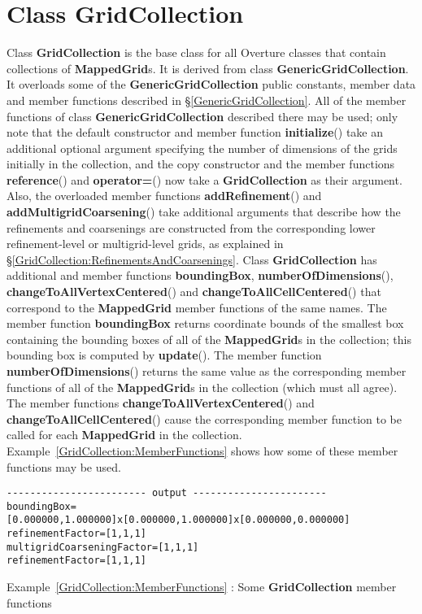 \documentclass{article}
\newcommand{\Index}[1]{#1\index{#1}}
\begin{document}
\section{Class \textbf{\Index{GridCollection}}}
\label{GridCollection}

Class \textbf{GridCollection} is the base class for all Overture classes that contain collections of \textbf{MappedGrid}s.
It is derived from class \textbf{GenericGridCollection}.  It overloads some of the \textbf{GenericGridCollection} public
constants, member data and member functions described in \S\ref{GenericGridCollection}.  All of the member functions of class
\textbf{GenericGridCollection} described there may be used; only note that the default constructor and member function
\textbf{initialize}() take an additional optional argument specifying the number of dimensions of the grids initially in the
collection, and the copy constructor and the member functions \textbf{reference}() and \textbf{operator=}() now take a
\textbf{GridCollection} as their argument. Also, the overloaded member functions \textbf{addRefinement}() and
\textbf{addMultigridCoarsening}() take additional arguments that describe how the refinements and coarsenings are constructed from
the corresponding lower refinement-level or multigrid-level grids, as explained in \S\ref{GridCollection:RefinementsAndCoarsenings}.  Class
\textbf{GridCollection} has additional and member functions \textbf{boundingBox}, \textbf{numberOfDimensions}(),
\textbf{changeToAllVertexCentered}() and \textbf{changeToAllCellCentered}() that correspond to the
\textbf{MappedGrid} member functions of the same names. The member function \textbf{boundingBox} returns coordinate bounds
of the smallest box containing the bounding boxes of all of the \textbf{MappedGrid}s in the collection; this bounding box is
computed by \textbf{update}().  The member function \textbf{numberOfDimensions}() returns the same value as the
corresponding member functions of all of the \textbf{MappedGrid}s in the collection (which must all agree).  The member functions
\textbf{changeToAllVertexCentered}() and \textbf{changeToAllCellCentered}() cause the corresponding member function to be
called for each \textbf{MappedGrid} in the collection.  Example~\ref{GridCollection:MemberFunctions} shows how some of these member
functions may be used.

{\small
{}
\begin{verbatim}
------------------------ output -----------------------
boundingBox=[0.000000,1.000000]x[0.000000,1.000000]x[0.000000,0.000000]
refinementFactor=[1,1,1]
multigridCoarseningFactor=[1,1,1]
refinementFactor=[1,1,1]
\end{verbatim}
}
{\center Example~\ref{GridCollection:MemberFunctions} : Some \textbf{GridCollection} member functions\label{GridCollection:MemberFunctions}}
\end{document}
